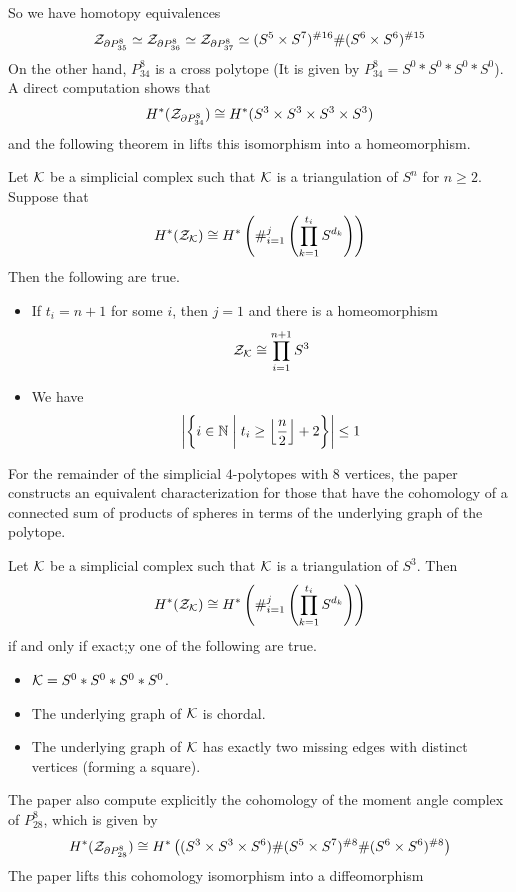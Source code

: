 \documentclass[a4paper]{article}
\begin{document}
So we have homotopy equivalences $$\mZ_{\partial P_{35}^8}\simeq\mZ_{\partial P_{36}^8}\simeq\mZ_{\partial P_{37}^8}\simeq(S^5\times S^7)^{\#16}\#(S^6\times S^6)^{\#15}$$ On the other hand, $P_{34}^8$ is a cross polytope (It is given by $P_{34}^8=S^0\ast S^0\ast S^0\ast S^0$). A direct computation shows that $$H^\ast(\mZ_{\partial P_{34}^8})\cong H^\ast(S^3\times S^3\times S^3\times S^3)$$ and the following theorem in \cite{Fan} lifts this isomorphism into a homeomorphism. 

\begin{thm}
Let $\mK$ be a simplicial complex such that $\mK$ is a triangulation of $S^n$ for $n\geq 2$. Suppose that $$H^\ast(\mZ_\mK)\cong H^\ast\left(\#_{i=1}^j\left(\prod_{k=1}^{t_i}S^{d_k}\right)\right)$$ Then the following are true. 
\begin{itemize}
\item If $t_i=n+1$ for some $i$, then $j=1$ and there is a homeomorphism $$\mZ_\mK\cong\prod_{i=1}^{n+1}S^3$$
\item We have $$\abs{\left\{i\in\N\;\bigg{|}\;t_i\geq\floor*{\frac{n}{2}}+2\right\}}\leq 1$$
\end{itemize}
\end{thm}

For the remainder of the simplicial $4$-polytopes with $8$ vertices, the paper \cite{Oganisian} constructs an equivalent characterization for those that have the cohomology of a connected sum of products of spheres in terms of the underlying graph of the polytope. 

\begin{thm}
Let $\mK$ be a simplicial complex such that $\mK$ is a triangulation of $S^3$. Then $$H^\ast(\mZ_\mK)\cong H^\ast\left(\#_{i=1}^j\left(\prod_{k=1}^{t_i}S^{d_k}\right)\right)$$ if and only if exact;y one of the following are true. 
\begin{itemize}
\item $\mK=S^0\ast S^0\ast S^0\ast S^0$. 
\item The underlying graph of $\mK$ is chordal. 
\item The underlying graph of $\mK$ has exactly two missing edges with distinct vertices (forming a square). 
\end{itemize}
\end{thm}

The paper \cite{Fan} also compute explicitly the cohomology of the moment angle complex of $P_{28}^8$, which is given by $$H^\ast(\mZ_{\partial P_{28}^8})\cong H^\ast\left((S^3\times S^3\times S^6)\#(S^5\times S^7)^{\#8}\#(S^6\times S^6)^{\#8}\right)$$ The paper \cite{Iriye} lifts this cohomology isomorphism into a diffeomorphism 
\end{document}
